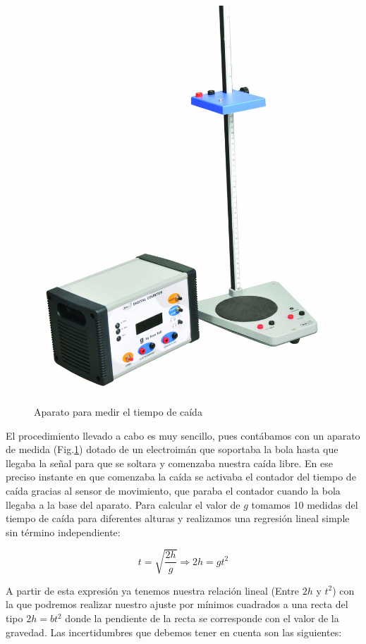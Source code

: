 \documentclass[a4paper,12pt,titlepage]{report}
\begin{document}
\begin{figure}
    \centering
    \includegraphics[width=0.7\linewidth]{Images/caidalibreaparato.jpg}
    \caption{Aparato para medir el tiempo de caída}
    \label{Montaje caida}
\end{figure}

El procedimiento llevado a cabo es muy sencillo, pues contábamos con un aparato de medida (Fig.\ref{Montaje caida}) dotado de un electroimán que soportaba la bola hasta que llegaba la señal para que se soltara y comenzaba nuestra caída libre. En ese preciso instante en que comenzaba la caída se activaba el contador del tiempo de caída gracias al sensor de movimiento, que paraba el contador cuando la bola llegaba a la base del aparato. Para calcular el valor de $g$ tomamos 10 medidas del tiempo de caída para diferentes alturas y realizamos una regresión lineal simple sin término independiente:

\begin{equation}
    t = \sqrt{\frac{2h}{g}} \Rightarrow 2h = gt^2
    \label{Ajuste gravedad}
\end{equation}

A partir de esta expresión ya tenemos nuestra relación lineal (Entre $2h$ y $t^2$) con la que podremos realizar nuestro ajuste por mínimos cuadrados a una recta del tipo $2h=bt^2$ donde la pendiente de la recta se corresponde con el valor de la gravedad. Las incertidumbres que debemos tener en cuenta son las siguientes:
\end{document}
